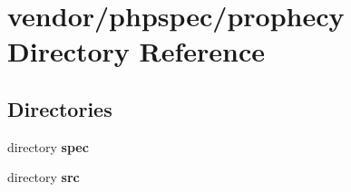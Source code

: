 \section{vendor/phpspec/prophecy Directory Reference}
\label{dir_06a6394ffe3388f944299f7e9b8637ec}
\subsection*{Directories}
\begin{DoxyCompactItemize}
\item 
directory {\bf spec}
\item 
directory {\bf src}
\end{DoxyCompactItemize}
